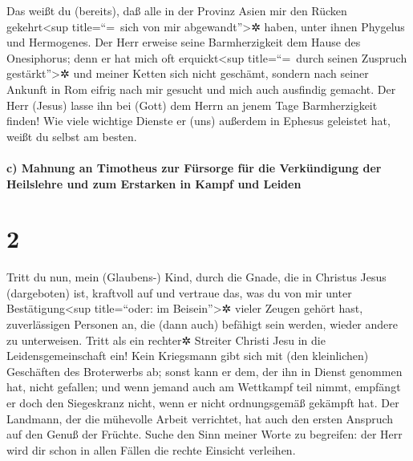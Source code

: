  Das weißt du (bereits), daß alle in der Provinz Asien
mir den Rücken gekehrt\textless sup title=``=~sich von mir
abgewandt''\textgreater✲ haben, unter ihnen Phygelus und Hermogenes.
 Der Herr erweise seine Barmherzigkeit dem Hause des
Onesiphorus; denn er hat mich oft erquickt\textless sup title=``=~durch
seinen Zuspruch gestärkt''\textgreater✲ und meiner Ketten sich nicht
geschämt,  sondern nach seiner Ankunft in Rom eifrig nach
mir gesucht und mich auch ausfindig gemacht.  Der Herr
(Jesus) lasse ihn bei (Gott) dem Herrn an jenem Tage Barmherzigkeit
finden! Wie viele wichtige Dienste er (uns) außerdem in Ephesus
geleistet hat, weißt du selbst am besten.

\hypertarget{c-mahnung-an-timotheus-zur-fuxfcrsorge-fuxfcr-die-verkuxfcndigung-der-heilslehre-und-zum-erstarken-in-kampf-und-leiden}{%
\paragraph{c) Mahnung an Timotheus zur Fürsorge für die Verkündigung der
Heilslehre und zum Erstarken in Kampf und
Leiden}\label{c-mahnung-an-timotheus-zur-fuxfcrsorge-fuxfcr-die-verkuxfcndigung-der-heilslehre-und-zum-erstarken-in-kampf-und-leiden}}

\hypertarget{section-1}{%
\section{2}\label{section-1}}

 Tritt du nun, mein (Glaubens-) Kind, durch die Gnade, die
in Christus Jesus (dargeboten) ist, kraftvoll auf  und
vertraue das, was du von mir unter Bestätigung\textless sup
title=``oder: im Beisein''\textgreater✲ vieler Zeugen gehört hast,
zuverlässigen Personen an, die (dann auch) befähigt sein werden, wieder
andere zu unterweisen.  Tritt als ein rechter✲ Streiter
Christi Jesu in die Leidensgemeinschaft ein!  Kein
Kriegsmann gibt sich mit (den kleinlichen) Geschäften des Broterwerbs
ab; sonst kann er dem, der ihn in Dienst genommen hat, nicht gefallen;
 und wenn jemand auch am Wettkampf teil nimmt, empfängt er
doch den Siegeskranz nicht, wenn er nicht ordnungsgemäß gekämpft hat.
 Der Landmann, der die mühevolle Arbeit verrichtet, hat
auch den ersten Anspruch auf den Genuß der Früchte.  Suche
den Sinn meiner Worte zu begreifen: der Herr wird dir schon in allen
Fällen die rechte Einsicht verleihen.


